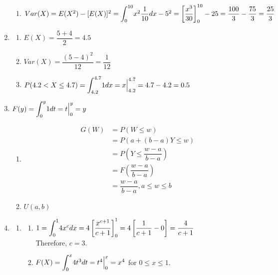 \documentclass{article}
\begin{document}
\begin{enumerate}
\begin{enumerate}
	 \item
	  $Var(X) = E(X^2) - [E(X)]^2 = \mathlarger{\int}_0^{10} {x^2 \dfrac{1}{10} dx} - 5^2
	    = \left[ \dfrac{x^3}{30} \right]_0^{10} - 25 = \dfrac{100}{3} - \dfrac{75}{3} 
	    = \dfrac{25}{3}$
	\end{enumerate}
      
      \item
	\begin{enumerate}
	 \item 
	  $E(X) = \dfrac{5+4}{2} = 4.5$
	  
	 \item
	  $Var(X) = \dfrac{(5-4)^2}{12} = \dfrac{1}{12}$
	 
	 \item
	  $P(4.2 < X \le 4.7) = \mathlarger{\int}_{4.2}^{4.7} {1 dx} = x \Big|_{4.2}^{4.7}
	    = 4.7 - 4.2 = 0.5$
	\end{enumerate}
      
      \item
	$F(y) = \mathlarger{\int}_0^y {1 dt} = t \Big|_0^y = y$
	
	\begin{enumerate}
	 \item 
	  \begin{align*}
	   G(W) &= P(W \le w) \\
	    &= P(a+(b-a)Y \le w) \\
	    &= P\left(Y \le \dfrac{w-a}{b-a}\right) \\
	    &= F\left(\dfrac{w-a}{b-a}\right) \\
	    &= \dfrac{w-a}{b-a}, a \le w \le b
	  \end{align*}
	 
	 \item
	  $U(a,b)$
	\end{enumerate}      
      \addtocounter{enumi}{1}
      
      \item
	\begin{enumerate}
	 \item 
	  \begin{enumerate}
	   \item 
	    $1 = \mathlarger{\int}_0^1 {4x^c dx} = 4\left[ \dfrac{x^{c+1}}{c+1} \right]_0^1
	      = 4 \left[ \dfrac{1}{c+1} - 0 \right] = \dfrac{4}{c+1}$ \\
	      
	    Therefore, $c = 3$.
	   
	   \item
	    $F(X) = \mathlarger{\int}_0^x{4t^3 dt} = t^4 \Big|_0^x = x^4$ for $0 \le x \le 1$.
	   

\end{enumerate}
\end{enumerate}
\end{enumerate}
\end{document}
